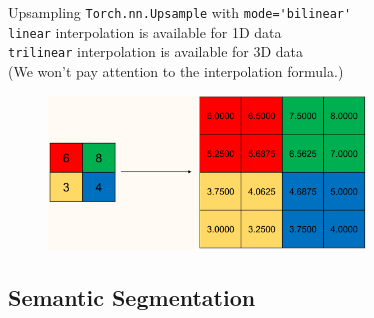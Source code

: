 \begin{frame}[allowframebreaks]

\begin{myconceptblock}{8.18}{Upsampling}
    \verb|Torch.nn.Upsample| with \verb|mode='bilinear'|\\
    \verb|linear| interpolation is available for 1D data\\
    \verb|trilinear| interpolation is available for 3D data\\
    (We won't pay attention to the interpolation formula.)

    \begin{figure}[H]
        \centering
        \includegraphics[width=0.75\textwidth]{.././assets/8.19.png}
    \end{figure}
\end{myconceptblock}

\end{frame}

\subsection{Semantic Segmentation}

